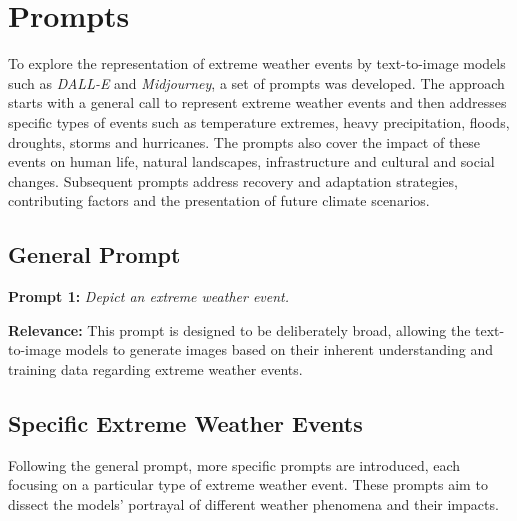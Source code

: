 \section{Prompts}
\label{appendix:prompts}


To explore the representation of extreme weather events by text-to-image models such as \textit{DALL-E} and \textit{Midjourney}, a set of prompts was developed. The approach starts with a general call to represent extreme weather events and then addresses specific types of events such as temperature extremes, heavy precipitation, floods, droughts, storms and hurricanes. The prompts also cover the impact of these events on human life, natural landscapes, infrastructure and cultural and social changes. Subsequent prompts address recovery and adaptation strategies, contributing factors and the presentation of future climate scenarios.

\subsection{General Prompt}
\begin{description}
\item \textbf{Prompt 1:} \textit{Depict an extreme weather event.}
\end{description}
\textbf{Relevance:} This prompt is designed to be deliberately broad, allowing the text-to-image models to generate images based on their inherent understanding and training data regarding extreme weather events.

\subsection{Specific Extreme Weather Events}
Following the general prompt, more specific prompts are introduced, each focusing on a particular type of extreme weather event. These prompts aim to dissect the models' portrayal of different weather phenomena and their impacts.

